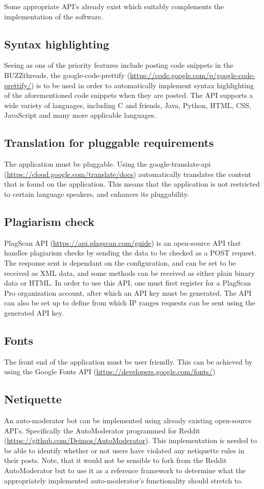 

\begin{flushleft}
	Some appropriate API's already exist which suitably complements the implementation of the software.
	
	\subsection{Syntax highlighting}
	Seeing as ons of the priority features include posting code snippets in the BUZZthreads, the google-code-prettify (\url{https://code.google.com/p/google-code-prettify/}) is to be used in order to automatically implement syntax highlighting of the aforementioned code snippets when they are posted. The API supports a wide variety of languages, including C and friends, Java, Python, HTML, CSS, JavaScript and many more applicable languages.
	\subsection{Translation for pluggable requirements}
	The application must be pluggable. Using the google-translate-api (\url{https://cloud.google.com/translate/docs}) 
	automatically translates the content that is found on the application. This means that the application is not restricted to certain language speakers, and enhances its pluggability.
	\subsection{Plagiarism check}
	PlagScan API (\url{https://api.plagscan.com/guide}) is an open-source API that handles plagiarism checks by sending the data to be checked as a POST request. The response sent is dependant on the configuration, and can be set to be received as XML data, and some methods can be received as either plain binary data or HTML. In order to use this API, one must first register for a PlagScan Pro organization account, after which an API key must be generated. The API can also be set up to define from which IP ranges requests can be sent using the generated API key.
	\subsection{Fonts}
	The front end of the application must be user friendly. This can be achieved by using the Google Fonts API (\url{https://developers.google.com/fonts/})
	\subsection{Netiquette}
	An auto-moderator bot can be implemented using already existing open-source API's. Specifically the AutoModerator programmed for Reddit (\url{https://github.com/Deimos/AutoModerator}). This implementation is needed to be able to identify whether or not users have violated any netiquette rules in their posts. Note, that it would not be sensible to fork from the Reddit AutoModerator but to use it as a reference framework to determine what the appropriately implemented auto-moderator's functionality should stretch to.

\end{flushleft}